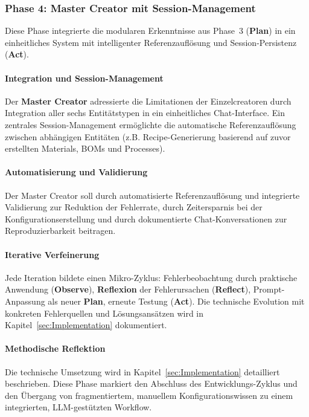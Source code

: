 \subsubsection{Phase 4: Master Creator mit Session-Management}
\label{subsubsec:Phase4}

Diese Phase integrierte die modularen Erkenntnisse aus Phase~3 (\textbf{Plan}) in ein einheitliches System mit intelligenter Referenzauflösung und Session-Persistenz (\textbf{Act}).

\paragraph{Integration und Session-Management}

Der \textbf{Master Creator} adressierte die Limitationen der Einzelcreatoren durch Integration aller sechs Entitätstypen in ein einheitliches Chat-Interface. Ein zentrales Session-Management ermöglichte die automatische Referenzauflösung zwischen abhängigen Entitäten (z.B. Recipe-Generierung basierend auf zuvor erstellten Materials, BOMs und Processes).

\paragraph{Automatisierung und Validierung}

Der Master Creator soll durch automatisierte Referenzauflösung und integrierte Validierung zur Reduktion der Fehlerrate, durch Zeitersparnis bei der Konfigurationserstellung und durch dokumentierte Chat-Konversationen zur Reproduzierbarkeit beitragen.

\paragraph{Iterative Verfeinerung}

Jede Iteration bildete einen Mikro-Zyklus: Fehlerbeobachtung durch praktische Anwendung (\textbf{Observe}), \textbf{Reflexion} der Fehlerursachen (\textbf{Reflect}), Prompt-Anpassung als neuer \textbf{Plan}, erneute Testung (\textbf{Act}). Die technische Evolution mit konkreten Fehlerquellen und Lösungsansätzen wird in Kapitel~\ref{sec:Implementation} dokumentiert.

\paragraph{Methodische Reflektion}

Die technische Umsetzung wird in Kapitel~\ref{sec:Implementation} detailliert beschrieben. Diese Phase markiert den Abschluss des Entwicklungs-Zyklus und den Übergang von fragmentiertem, manuellem Konfigurationswissen zu einem integrierten, LLM-gestützten Workflow.


